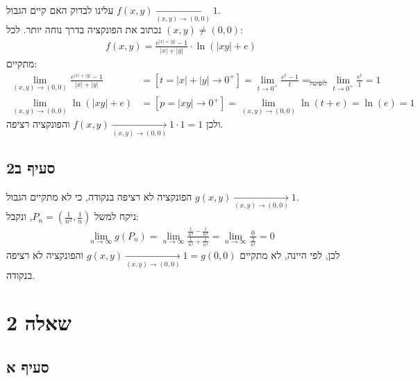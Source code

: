 \documentclass{article}
\DeclareMathOperator*{\equals}{=}
\begin{document}
עלינו לבדוק האם קיים הגבול $f(x,y)\xrightarrow[(x,y)\rightarrow(0,0)]{}1$. \\
נכתוב את הפונקציה בדרך נוחה יותר. לכל $(x,y)\ne (0,0)$:
\begin{align*}
    f(x,y)=\frac{e^{|x|+|y|}-1}{|x|+|y|}\cdot \ln(|xy|+e)
\end{align*}
מתקיים:
\begin{align*}
    \lim_{(x,y)\rightarrow(0,0)}\frac{e^{|x|+|y|}-1}{|x|+|y|} & =
    [t=|x|+|y|\rightarrow 0^+]=
    \lim_{t\rightarrow 0^+}\frac{e^t-1}{t}\equals_{\text{לופיטל}}
    \lim_{t\rightarrow 0^+}\frac{e^t}{1}=1                        \\
    \lim_{(x,y)\rightarrow(0,0)} \ln(|xy|+e)                  & =
    [p=|xy|\rightarrow 0^+]=
    \lim_{(x,y)\rightarrow(0,0)} \ln(t+e)=
    \ln(e)=1
\end{align*}
ולכן $f(x,y)\xrightarrow[(x,y)\rightarrow(0,0)]{}1\cdot 1=1$ והפונקציה רציפה.

\subsection*{סעיף ב2}

הפונקציה לא רציפה בנקודה, כי לא מתקיים הגבול $g(x,y)\xrightarrow[(x,y)\rightarrow(0,0)]{}1$. \\
ניקח למשל $P_n=(\frac{1}{n^2}, \frac{1}{n})$, ונקבל:
\begin{align*}
    \lim_{n\rightarrow\infty} g(P_n)=
    \lim_{n\rightarrow\infty} \frac{\frac{1}{n^4}-\frac{1}{n^4}}{\frac{1}{n^4}+\frac{1}{n^4}}=
    \lim_{n\rightarrow\infty} \frac{0}{\frac{2}{n^4}}=0
\end{align*}
לכן, לפי היינה, לא מתקיים $g(x,y)\xrightarrow[(x,y)\rightarrow(0,0)]{}1=g(0,0)$ והפונקציה לא רציפה בנקודה.

\pagebreak

\section*{שאלה 2}

\subsection*{סעיף א}
\end{document}
